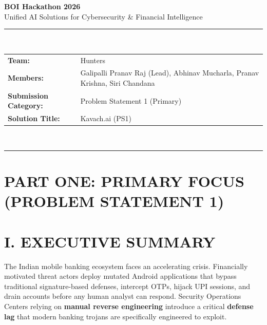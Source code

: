 \documentclass[10pt,a4paper]{article}
\begin{document}

\begin{center}
{\LARGE\bfseries BOI Hackathon 2026}\\[4pt]
{\large Unified AI Solutions for Cybersecurity \& Financial Intelligence}\\[8pt]
\rule{\linewidth}{1.2pt}\\[6pt]
\begin{tabularx}{\linewidth}{lX}
\textbf{Team:} & Hunters \\
\textbf{Members:} & Galipalli Pranav Raj (Lead), Abhinav Mucharla, Pranav Krishna, Siri Chandana \\
\textbf{Submission Category:} & Problem Statement 1 (Primary) \\
\textbf{Solution Title:} & Kavach.ai (PS1)
\end{tabularx}\\[4pt]
\rule{\linewidth}{0.6pt}
\end{center}

\vspace{6pt}

\tableofcontents
\newpage

\section*{PART ONE: PRIMARY FOCUS (PROBLEM STATEMENT 1)}

\section{I. EXECUTIVE SUMMARY}

The Indian mobile banking ecosystem faces an accelerating crisis. Financially motivated threat actors deploy mutated Android applications that bypass traditional signature-based defenses, intercept OTPs, hijack UPI sessions, and drain accounts before any human analyst can respond. Security Operations Centers relying on \textbf{manual reverse engineering} introduce a critical \textbf{defense lag} that modern banking trojans are specifically engineered to exploit.
\end{document}
